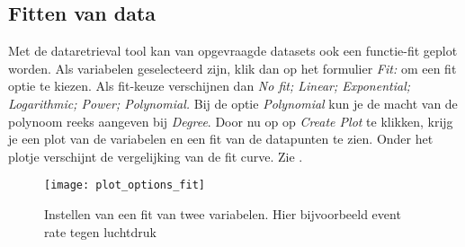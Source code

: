 \subsection{Fitten van data}

Met de dataretrieval tool kan van opgevraagde datasets ook een functie-fit geplot 
worden. Als variabelen geselecteerd zijn, klik dan op het formulier \emph{Fit:} 
om een fit optie te kiezen. Als fit-keuze verschijnen dan \emph{No fit; Linear;
Exponential; Logarithmic; Power; Polynomial.} Bij de optie \emph{Polynomial} 
kun je de macht van de polynoom reeks aangeven bij \emph{Degree}.
Door nu op op \emph{Create Plot} te klikken, krijg je een plot van de variabelen
en een fit van de datapunten te zien. Onder het plotje verschijnt de vergelijking 
van de fit curve. Zie .

\begin{figure}
    \centering
    \texttt{[image: plot\_options\_fit]}
    \caption{Instellen van een fit van twee variabelen. Hier bijvoorbeeld 
    event rate tegen luchtdruk}
    \label{fig:plot_options_fit}
\end{figure}



